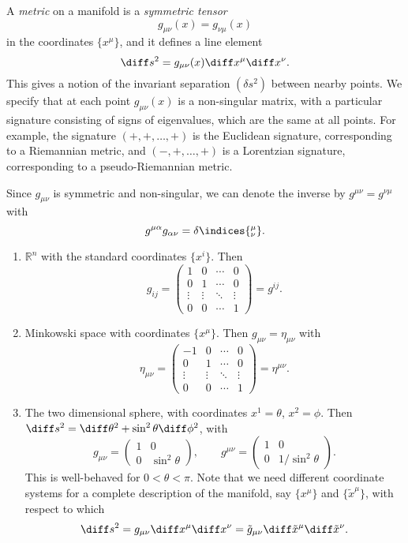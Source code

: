 \documentclass[12pt]{article}
\begin{document}
A \emph{metric} on a manifold is a \emph{symmetric tensor}
\[
g_{\mu \nu}(x) = g_{\nu \mu}(x)
\]
in the coordinates $\{x^\mu\}$, and it defines a line element
\[
\diff s^2 = g_{\mu \nu}(x) \diff x^\mu \diff x^\nu.
\]
This gives a notion of the invariant separation $(\delta s^2)$ between nearby points. We specify that at each point $g_{\mu \nu}(x)$ is a non-singular matrix, with a particular signature consisting of signs of eigenvalues, which are the same at all points. For example, the signature $(+, +, \ldots, +)$ is the Euclidean signature, corresponding to a Riemannian metric, and $(-, +, \ldots, +)$ is a Lorentzian signature, corresponding to a pseudo-Riemannian metric.


Since $g_{\mu \nu}$ is symmetric and non-singular, we can denote the inverse by $g^{\mu \nu} = g^{\nu \mu}$ with
\[
	g^{\mu \alpha} g_{\alpha \nu} = \delta\indices{^\mu_\nu}.
\]

\begin{exbox}
	\begin{enumerate}
		\item $\mathbb{R}^n$ with the standard coordinates $\{x^i\}$. Then
			\[
			g_{ij} =
			\begin{pmatrix}
				 1 & 0 & \cdots & 0 \\
				 0 & 1 & \cdots & 0 \\
				 \vdots & \vdots & \ddots & \vdots \\
				 0 & 0 & \cdots & 1
			\end{pmatrix}
			= g^{ij}.
			\]
		\item Minkowski space with coordinates $\{x^\mu\}$. Then $g_{\mu \nu} = \eta_{\mu \nu}$ with
			\[
			\eta_{\mu \nu} =
			\begin{pmatrix}
				 -1 & 0 & \cdots & 0 \\
				 0 & 1 & \cdots & 0 \\
				 \vdots & \vdots & \ddots & \vdots \\
				 0 & 0 & \cdots & 1
			\end{pmatrix}
			= \eta^{\mu \nu}.
			\]
		\item The two dimensional sphere, with coordinates $x^1 = \theta$, $x^2 = \phi$. Then $\diff s^2 = \diff \theta^2 + \sin^2 \theta \diff \phi^2$, with
			\[
			g_{\mu \nu}=
			\begin{pmatrix}
				1 & 0\\ 0 & \sin^2\theta
			\end{pmatrix}, \qquad
			g^{\mu \nu} =
			\begin{pmatrix}
				1&0\\0&1/\sin^2\theta
			\end{pmatrix}.
			\]
			This is well-behaved for $0 < \theta < \pi$. Note that we need different coordinate systems for a complete description of the manifold, say $\{x^\mu\}$ and $\{\tilde x^\mu\}$, with respect to which
			\[
			\diff s^2 = g_{\mu \nu} \diff x^\mu \diff x^\nu = \tilde g_{\mu \nu} \diff \tilde x^\mu \diff \tilde x^\nu.
			\]
	\end{enumerate}
\end{exbox}
\end{document}
